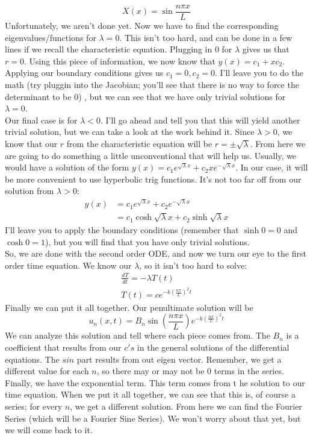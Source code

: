 \documentclass{article}
\begin{document}
\[
X(x) = \sin{\frac{n\pi x}{L}}
\]
\indent Unfortunately, we aren't done yet. Now we have to find the corresponding eigenvalues/functions for $\lambda = 0$. This isn't too hard, and can be done in a few lines if we recall the characteristic equation. Plugging in $0$ for $\lambda$ gives us that $r = 0$. Using this piece of information, we now know that $y(x) = c_{1} + xc_{2}$. Applying our boundary conditions gives us $c_{1} = 0, c_{2} = 0$. I'll leave you to do the math (try pluggin into the Jacobian; you'll see that there is no way to force the determinant to be 0) , but we can see that we have only trivial solutions for $\lambda = 0$.\\
\indent Our final case is for $\lambda < 0$. I'll go ahead and tell you that this will yield another trivial solution, but we can take a look at the work behind it. Since $\lambda > 0$, we know that our $r$ from the characteristic equation will be $r = \pm \sqrt{\lambda}$. From here we are going to do something a little unconventional that will help us. Usually, we would have a solution of the form $y(x) = c_{1}e^{\sqrt{\lambda}x} + c_{2}x e^{-\sqrt{\lambda}x}$. In our case, it will be more convenient to use hyperbolic trig functions. It's not too far off from our solution from $\lambda > 0$:
\begin{align*}
y(x) &= c_{1}e^{\sqrt{\lambda}x} + c_{2}e^{-\sqrt{\lambda}x}\\
&= c_{1}\cosh{\sqrt{\lambda}x} + c_{2}\sinh{\sqrt{\lambda}x}
\end{align*}
\noindent I'll leave you to apply the boundary conditions (remember that $\sinh{0} = 0$ and $\cosh{0} = 1$), but you will find that you have only trivial solutions.\\
\indent So, we are done with the second order ODE, and now we turn our eye to the first order time equation. We know our $\lambda$, so it isn't too hard to solve:
\begin{gather*}
\frac{dT}{dt} = -\lambda T(t)\\
T(t) = ce^{-k\left(\frac{n\pi}{L}\right)^{2}t}
\end{gather*}
\indent Finally we can put it all together. Our penultimate solution will be 
\[
u_{n}(x,t) = B_{n}\sin{\left(\frac{n\pi x}{L}\right)}e^{-k\left(\frac{n\pi}{L}\right)^{2}t}
\]
\noindent We can analyze this solution and tell where each piece comes from. The $B_{n}$ is a coefficient that results from our $c's$ in the general solutions of the differential equations. The $sin$ part results from out eigen vector. Remember, we get a different value for each $n$, so there may or may not be $0$ terms in the series. Finally, we have the exponential term. This term comes from t he solution to our time equation. When we put it all together, we can see that this is, of course a series; for every $n$, we get a different solution. From here we can find the Fourier Series (which will be a Fourier Sine Series). We won't worry about that yet, but we will come back to it.
\end{document}
